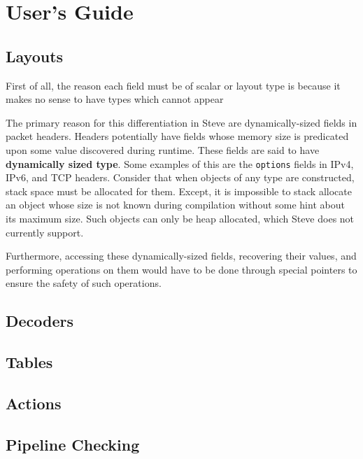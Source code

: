 \chapter{User's Guide} \label{users_guide}

\section{Layouts} \label{layout_guide}

First of all, the reason each field must be of scalar or layout type is because it makes no sense to have types which cannot appear 

The primary reason for this differentiation in Steve are dynamically-sized fields in packet headers. Headers potentially have fields whose memory size is predicated upon some value discovered during runtime. These fields are said to have \textbf{dynamically sized type}. Some examples of this are the \texttt{options} fields in IPv4, IPv6, and TCP headers. Consider that when objects of any type are constructed, stack space must be allocated for them. Except, it is impossible to stack allocate an object whose size is not known during compilation without some hint about its maximum size. Such objects can only be heap allocated, which Steve does not currently support. 

Furthermore, accessing these dynamically-sized fields, recovering their values, and performing operations on them would have to be done through special pointers to ensure the safety of such operations.

\section{Decoders} \label{decoder_guide}

\section{Tables} \label{table_guide}

\section{Actions} \label{actions_guide}

\section{Pipeline Checking} \label{pipeline)checking_guide}